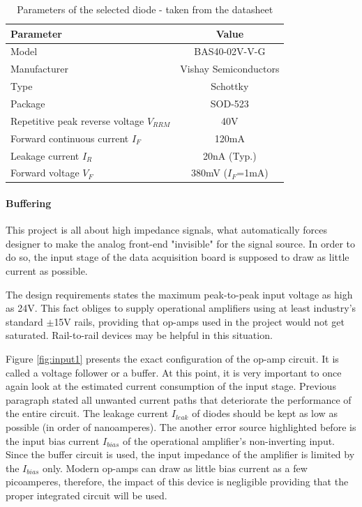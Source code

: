 \documentclass[12pt,a4paper]{article}
\begin{document}
\begin{table}[ht!]
\begin{tabular}{|l|c|}
\hline
\textbf{Parameter}		& \textbf{Value} 	\\ \hline
Model  			& BAS40-02V-V-G         	\\ \hline
Manufacturer    & Vishay Semiconductors	\\ \hline
Type           	& Schottky  			\\ \hline
Package &  SOD-523		\\ \hline
Repetitive peak reverse voltage $V_{RRM}$ &  40V \\ \hline
Forward continuous current $I_{F}$ &  120mA \\ \hline
Leakage current $I_{R}$ &  20nA (Typ.) \\ \hline
Forward voltage $V_{F}$ &  380mV ($I_F$=1mA) \\ \hline
\end{tabular}
\caption{Parameters of the selected diode - taken from the datasheet \cite{bas40_params}}
\label{tab:bas40_params}
\end{table}

\paragraph{Buffering}

This project is all about high impedance signals, what automatically forces designer to make the analog front-end "invisible" for the signal source. In order to do so, the input stage of the data acquisition board is supposed to draw as little current as possible. 
\par

The design requirements states the maximum peak-to-peak input voltage as high as 24V. This fact obliges to supply operational amplifiers using at least industry's standard $\pm$15V rails, providing that op-amps used in the project would not get saturated. Rail-to-rail devices may be helpful in this situation.
\par
Figure \ref{fig:input1} presents the exact configuration of the op-amp circuit. It is called a voltage follower or a buffer. At this point, it is very important to once again look at the estimated current consumption of the input stage. Previous paragraph stated all unwanted current paths that deteriorate the performance of the entire circuit. The leakage current $I_{leak}$ of diodes should be kept as low as possible (in order of nanoamperes). The another error source highlighted before is the input bias current $I_{bias}$ of the operational amplifier's non-inverting input. Since the buffer circuit is used, the input impedance of the amplifier is limited by the $I_{bias}$ only. Modern op-amps can draw as little bias current as a few picoamperes, therefore, the impact of this device is negligible providing that the proper integrated circuit will be used.
\par
\end{document}
